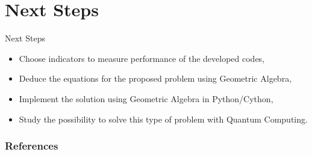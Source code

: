 \documentclass[aspectratio=169]{beamer}
\begin{document}
\section{Next Steps}
\begin{frame}{Next Steps}
  \begin{itemize}
    \item Choose indicators to measure performance of the developed codes,
    \item Deduce the equations for the proposed problem using Geometric Algebra,
    \item Implement the solution using Geometric Algebra in Python/Cython,
    \item Study the possibility to solve this type of problem with Quantum Computing.
  \end{itemize}
\end{frame}

\begin{frame}[allowframebreaks]
  \frametitle{References}
  
  
\end{frame}
\end{document}
